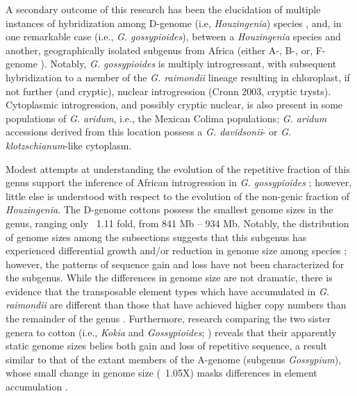 \documentclass{bmcart}
\newcommand{\note}[2][]{\added[id=#1,remark={#2}]{}}
\begin{document}
A secondary outcome of this research has been the elucidation of multiple instances of hybridization among D-genome (i.e, \textit{Houzingenia}) species \note[Corrinne]{cite Cryptic Trysts}, and, in one remarkable case (i.e., \textit{G. gossypioides}), between a \textit{Houzingenia} species and another, geographically isolated subgenus from Africa (either A-, B-, or, F-genome \note[Corrinne]{cite cryptic Trysts again}). Notably, \textit{G. gossypioides} is multiply introgressant, with subsequent hybridization to a member of the \textit{G. raimondii} lineage resulting in chloroplast, if not further (and cryptic), nuclear introgression (Cronn 2003, cryptic trysts). Cytoplasmic introgression, and possibly cryptic nuclear, is also present in some populations of \textit{G. aridum}, i.e., the Mexican Colima populations; \textit{G. aridum} accessions derived from this location possess a \textit{G. davidsonii}- or \textit{G. klotzschianum}-like cytoplasm.

Modest attempts at understanding the evolution of the repetitive fraction of this genus support the inference of African introgression in \textit{G. gossypioides} \note[Corrinne]{Zhao 1998}; however, little else is understood with respect to the evolution of the non-genic fraction of \textit{Houzingenia}. The D-genome cottons possess the smallest genome sizes in the genus, ranging only ~1.11 fold, from 841 Mb – 934 Mb.  Notably, the distribution of genome sizes among the subsections suggests that this subgenus has experienced differential growth and/or reduction in genome size among species \note[Corrinne]{need a figure}; however, the patterns of sequence gain and loss have not been characterized for the subgenus. While the differences in genome size are not dramatic, there is evidence that the transposable element types which have accumulated in \textit{G. raimondii} are different than those that have achieved higher copy numbers than the remainder of the genus \note[Corrinne]{Jennifer, A domestication, kokia}. Furthermore, research comparing the two sister genera to cotton (i.e., \textit{Kokia} and \textit{Gossypioides}; \note[Corrinne]{cite Kokia paper}) reveals that their apparently static genome sizes belies both gain and loss of repetitive sequence, a result similar to that of the extant members of the A-genome (subgenus \textit{Gossypium}), whose small change in genome size (~1.05X) masks differences in element accumulation \note[Corrinne]{cite Agenome domestication}.
\end{document}
